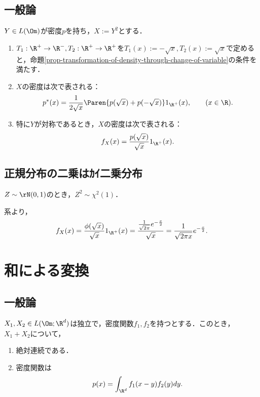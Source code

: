 \documentclass[uplatex,dvipdfmx]{jsreport}
\begin{document}
\subsection{一般論}

\begin{corollary}
    $Y\in L(\Om)$が密度$p$を持ち，$X:=Y^2$とする．
    \begin{enumerate}
        \item $T_1:\R^+\to\R^-,T_2:\R^+\to\R^+$を$T_1(x):=-\sqrt{x},T_2(x):=\sqrt{x}$で定めると，命題\ref{prop-transformation-of-density-through-change-of-variable}の条件を満たす．
        \item $X$の密度は次で表される：
        \[p^*(x)=\frac{1}{2\sqrt{x}}\Paren{p(\sqrt{x})+p(-\sqrt{x})}1_{\R^+}(x),\qquad(x\in\R).\]
        \item 特に$Y$が対称であるとき，$X$の密度は次で表される：
        \[f_X(x)=\frac{p(\sqrt{x})}{\sqrt{x}}1_{\R^+}(x).\]
    \end{enumerate}
\end{corollary}

\subsection{正規分布の二乗はｶｲ二乗分布}

\begin{proposition}
    $Z\sim\rN(0,1)$のとき，$Z^2\sim\chi^2(1)$．
\end{proposition}
\begin{Proof}
    系より，
    \[f_X(x)=\frac{\phi(\sqrt{x})}{\sqrt{x}}1_{\R^+}(x)=\frac{\frac{1}{\sqrt{2\pi}}e^{-\frac{x}{2}}}{\sqrt{x}}=\frac{1}{\sqrt{2\pi x}}e^{-\frac{x}{2}}.\]
\end{Proof}

\section{和による変換}

\subsection{一般論}

\begin{theorem}
    $X_1,X_2\in L(\Om;\R^d)$は独立で，密度関数$f_1,f_2$を持つとする．このとき，$X_1+X_2$について，
    \begin{enumerate}
        \item 絶対連続である．
        \item 密度関数は
        \[p(x)=\int_{\R^d}f_1(x-y)f_2(y)dy.\]
    \end{enumerate}
\end{theorem}
\end{document}
